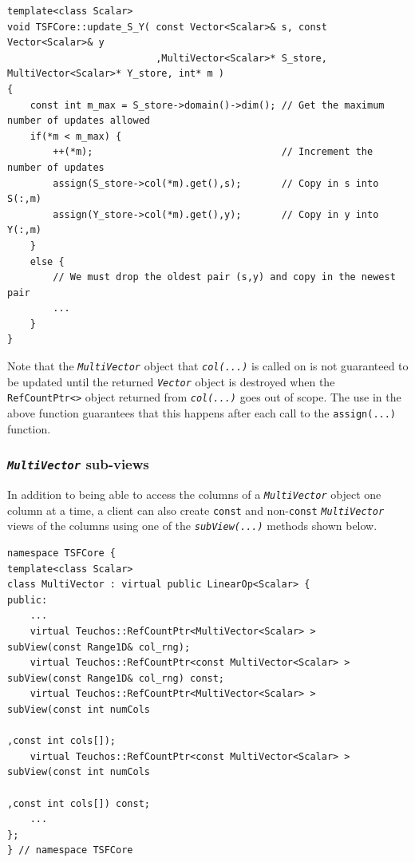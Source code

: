 {\scriptsize\begin{verbatim}
template<class Scalar>
void TSFCore::update_S_Y( const Vector<Scalar>& s, const Vector<Scalar>& y
                          ,MultiVector<Scalar>* S_store, MultiVector<Scalar>* Y_store, int* m )
{
    const int m_max = S_store->domain()->dim(); // Get the maximum number of updates allowed
    if(*m < m_max) {
        ++(*m);                                 // Increment the number of updates
        assign(S_store->col(*m).get(),s);       // Copy in s into S(:,m)         
        assign(Y_store->col(*m).get(),y);       // Copy in y into Y(:,m)
    }
    else {
        // We must drop the oldest pair (s,y) and copy in the newest pair
        ...
    }
}
\end{verbatim}}

\noindent Note that the \texttt{\textit{Multi\-Vector}} object that
\texttt{\textit{col(...)}} is called on is not guaranteed to be
updated until the returned \texttt{\textit{Vector}} object is
destroyed when the \texttt{RefCountPtr<>} object returned from
\texttt{\textit{col(...)}} goes out of scope.  The use in the above function
guarantees that this happens after each call to the
\texttt{assign(...)} function.

%
\subsubsection{\texttt{\textit{Multi\-Vector}} sub-views}
%

In addition to being able to access the columns of a
\texttt{\textit{Multi\-Vector}} object one column at a time, a client
can also create \texttt{const} and non-\texttt{const}
\texttt{\textit{Multi\-Vector}} views of the columns
using one of the \texttt{\textit{subView(...)}} methods shown below.

{\scriptsize\begin{verbatim}
namespace TSFCore {
template<class Scalar>
class MultiVector : virtual public LinearOp<Scalar> {
public:
    ...
    virtual Teuchos::RefCountPtr<MultiVector<Scalar> >       subView(const Range1D& col_rng);
    virtual Teuchos::RefCountPtr<const MultiVector<Scalar> > subView(const Range1D& col_rng) const;
    virtual Teuchos::RefCountPtr<MultiVector<Scalar> >       subView(const int numCols
                                                                          ,const int cols[]);
    virtual Teuchos::RefCountPtr<const MultiVector<Scalar> > subView(const int numCols
                                                                          ,const int cols[]) const;
    ...
};
} // namespace TSFCore
\end{verbatim}}

